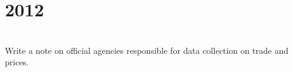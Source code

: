 \section*{2012}
\vspace{-.5cm}
\hrulefill \smallskip\\
 Write a note on official agencies responsible for data collection on trade and prices.

